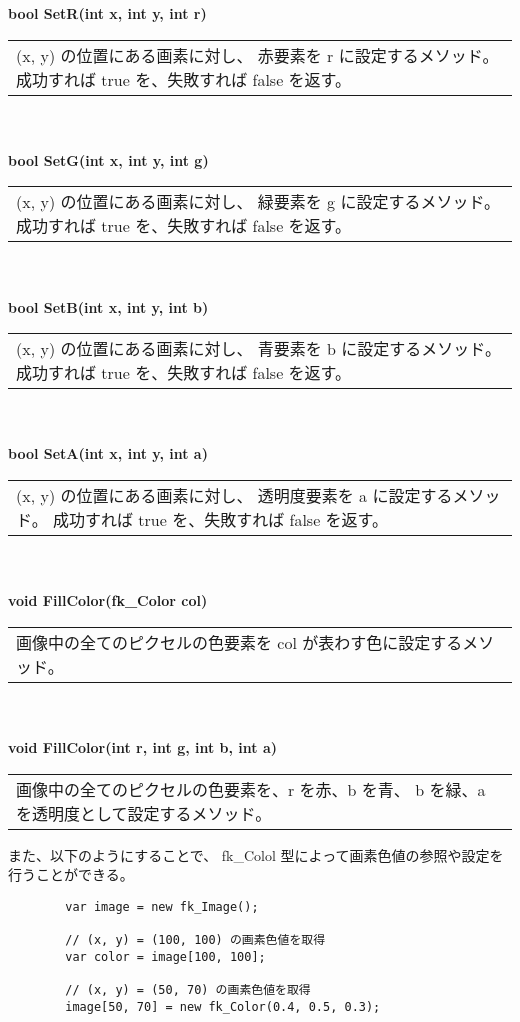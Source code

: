 \begin{tabbing}
\> \textbf{bool SetR(int x, int y, int r)} \\
	\> \> \begin{tabular}{p{15cm}}
		(x, y) の位置にある画素に対し、
		赤要素を r に設定するメソッド。
		成功すれば true を、失敗すれば false を返す。
	\end{tabular} \\ \\

\> \textbf{bool SetG(int x, int y, int g)} \\
	\> \> \begin{tabular}{p{15cm}}
		(x, y) の位置にある画素に対し、
		緑要素を g に設定するメソッド。
		成功すれば true を、失敗すれば false を返す。
	\end{tabular} \\ \\

\> \textbf{bool SetB(int x, int y, int b)} \\
	\> \> \begin{tabular}{p{15cm}}
		(x, y) の位置にある画素に対し、
		青要素を b に設定するメソッド。
		成功すれば true を、失敗すれば false を返す。
	\end{tabular} \\ \\

\> \textbf{bool SetA(int x, int y, int a)} \\
	\> \> \begin{tabular}{p{15cm}}
		(x, y) の位置にある画素に対し、
		透明度要素を a に設定するメソッド。
		成功すれば true を、失敗すれば false を返す。
	\end{tabular} \\ \\

\> \textbf{void FillColor(fk\_Color col)} \\
	\> \> \begin{tabular}{p{15cm}}
		画像中の全てのピクセルの色要素を col が表わす色に設定するメソッド。
	\end{tabular} \\ \\

\> \textbf{void FillColor(int r, int g, int b, int a)} \\
	\> \> \begin{tabular}{p{15cm}}
		画像中の全てのピクセルの色要素を、r を赤、b を青、
		b を緑、a を透明度として設定するメソッド。
	\end{tabular}
\end{tabbing}

また、以下のようにすることで、
fk\_Colol 型によって画素色値の参照や設定を行うことができる。
\\
\begin{breakbox}
\begin{verbatim}
        var image = new fk_Image();

        // (x, y) = (100, 100) の画素色値を取得
        var color = image[100, 100];

        // (x, y) = (50, 70) の画素色値を取得
        image[50, 70] = new fk_Color(0.4, 0.5, 0.3);
\end{verbatim}
\end{breakbox}

